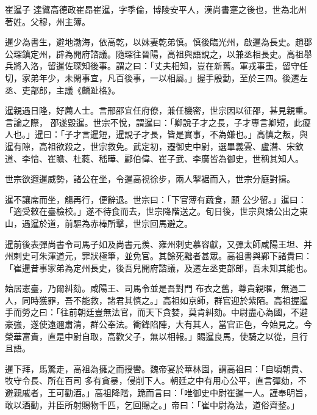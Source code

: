 
\begin{pinyinscope}

 崔暹子
 達鷿高德政崔昂崔暹，字季倫，博陵安平人，漢尚書寔之後也，世為北州
 著姓。父穆，州主簿。



 暹少為書生，避地渤海，依高乾，以妹妻乾弟慎。慎後臨光州，啟暹為長史。趙郡公琛鎮定州，辟為開府諮議。隨琛往晉陽，高祖與語說之，以兼丞相長史。高祖舉兵將入洛，留暹佐琛知後事。謂之曰：「丈夫相知，豈在新舊。軍戎事重，留守任切，家弟年少，未閑事宜，凡百後事，一以相屬。」握手殷勤，至於三四。後遷左丞、吏部郎，主議《麟趾格》。



 暹親遇日隆，好薦人士。言邢邵宜任府僚，兼任機密，世宗因以征邵，甚見親重。言論之際，
 邵遂毀暹。世宗不悅，謂暹曰：「卿說子才之長，子才專言卿短，此癡人也。」暹曰：「子才言暹短，暹說子才長，皆是實事，不為嫌也。」高慎之叛，與暹有隙，高祖欲殺之，世宗救免。武定初，遷御史中尉，選畢義雲、盧潛、宋欽道、李愔、崔瞻、杜蕤、嵇曄、酈伯偉、崔子武、李廣皆為御史，世稱其知人。



 世宗欲遐暹威勢，諸公在坐，令暹高視徐步，兩人掣裾而入，世宗分庭對揖。



 暹不讓席而坐，觴再行，便辭退。世宗曰：「下官薄有蔬食，願
 公少留。」暹曰：「適受敕在臺檢校。」遂不待食而去，世宗降階送之。旬日後，世宗與諸公出之東山，遇暹於道，前驅為赤棒所擊，世宗回馬避之。



 暹前後表彈尚書令司馬子如及尚書元羨、雍州刺史慕容獻，又彈太師咸陽王坦、并州刺史可朱渾道元，罪狀極筆，並免官。其餘死黜者甚眾。高祖書與鄴下諸貴曰：「崔暹昔事家弟為定州長史，後吾兒開府諮議，及遷左丞吏部郎，吾未知其能也。



 始居憲臺，乃爾糾劾。咸陽王、司馬令並是吾對門
 布衣之舊，尊貴親暱，無過二人，同時獲罪，吾不能救，諸君其慎之。」高祖如京師，群官迎於紫陌。高祖握暹手而勞之曰：「往前朝廷豈無法官，而天下貪婪，莫肯糾劾。中尉盡心為國，不避豪強，遂使遠邇肅清，群公奉法。衝鋒陷陣，大有其人，當官正色，今始見之。今榮華富貴，直是中尉自取，高歡父子，無以相報。」賜暹良馬，使騎之以從，且行且語。



 暹下拜，馬驚走，高祖為擁之而授轡。魏帝宴於華林園，謂高祖曰：「自頃朝貴、牧守令長、所在百司
 多有貪暴，侵削下人。朝廷之中有用心公平，直言彈劾，不避親戚者，王可勸酒。」高祖降階，跪而言曰：「唯御史中尉崔暹一人。謹奉明旨，敢以酒勸，并臣所射賜物千匹，乞回賜之。」帝曰：「崔中尉為法，道俗齊整。」




\end{pinyinscope}
